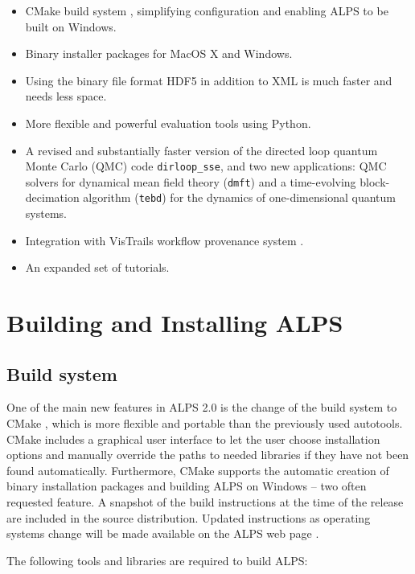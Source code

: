 \documentclass[12pt]{iopart}
\begin{document}
 \begin{itemize}
\item CMake build system \cite{cmake}, simplifying configuration and enabling ALPS to be built on  Windows.
\item Binary installer packages for MacOS X and Windows.
\item Using the binary file format HDF5 \cite{hdf5} in addition to XML is much faster and needs less space.
\item More flexible and powerful evaluation tools using Python.
\item A revised and substantially faster version of the directed loop quantum Monte Carlo (QMC) code {\tt dirloop\_sse}, and two new applications: QMC solvers for dynamical 
mean field theory ({\tt dmft}) and a time-evolving block-decimation algorithm ({\tt tebd}) for the dynamics of one-dimensional quantum systems.
\item Integration with VisTrails workflow provenance system \cite{vistrails}.
\item An expanded set of tutorials.
 \end{itemize}
 
 
\section{Building and Installing ALPS}
\subsection{Build system}
One of the main new features in ALPS 2.0 is the change of the build system to CMake \cite{cmake}, which is more flexible and portable than the previously used autotools. CMake includes a graphical user interface to let the user choose installation options and manually override the paths to needed libraries if they have not been found automatically. Furthermore,  CMake supports the automatic creation of binary installation packages and building ALPS on Windows -- two often requested feature. A snapshot of the build instructions at the time of the release are included in the source distribution. Updated instructions as operating systems change will be made available on the ALPS web page \cite{alps}.

The following tools and libraries are required to build ALPS:
\end{document}
